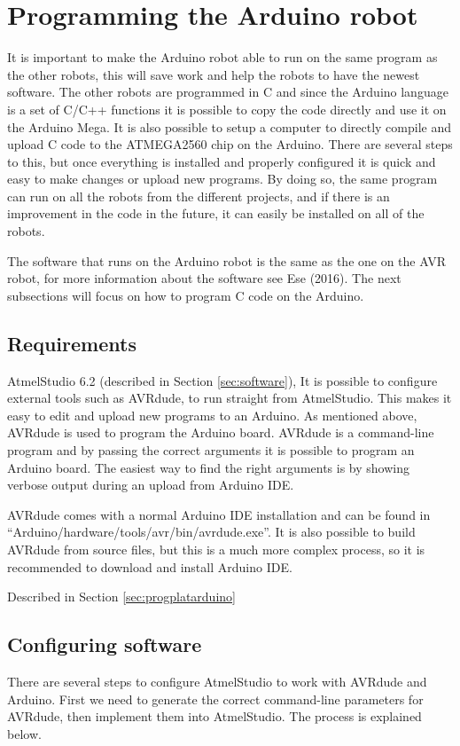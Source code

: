 \section{Programming the Arduino robot}
It is important to make the Arduino robot able to run on the same program as the other robots, this will save work and help the robots to have the newest software. The other robots are programmed in C and since the Arduino language is a set of C/C++ functions it is possible to copy the code directly and use it on the Arduino Mega. It is also possible to setup a computer to directly compile and upload C code to the ATMEGA2560 chip on the Arduino. There are several steps to this, but once everything is installed and properly configured it is quick and easy to make changes or upload new programs. By doing so, the same program can run on all the robots from the different projects, and if there is an improvement in the code in the future, it can easily be installed on all of the robots.

The software that runs on the Arduino robot is the same as the one on the AVR robot, for more information about the software see Ese (2016). The next subsections will focus on how to program C code on the Arduino.
\subsection{Requirements}
AtmelStudio 6.2 (described in Section \ref{sec:software}), It is possible to configure external tools such as AVRdude, to run straight from AtmelStudio. This makes it easy to edit and upload new programs to an Arduino.
\newpage
{}
As mentioned above, AVRdude is used to program the Arduino board. AVRdude is a command-line program and by passing the correct arguments it is possible to program an Arduino board. The easiest way to find the right arguments is by showing verbose output during an upload from Arduino IDE.

AVRdude comes with a normal Arduino IDE installation and can be found in ``Arduino/hardware/tools/avr/bin/avrdude.exe''. It is also possible to build AVRdude from source files, but this is a much more complex process, so it is recommended to download and install Arduino IDE.

Described in Section \ref{sec:progplatarduino}

\subsection{Configuring software}
There are several steps to configure AtmelStudio to work with AVRdude and Arduino. First we need to generate the correct command-line parameters for AVRdude, then implement them into AtmelStudio. The process is explained below.

